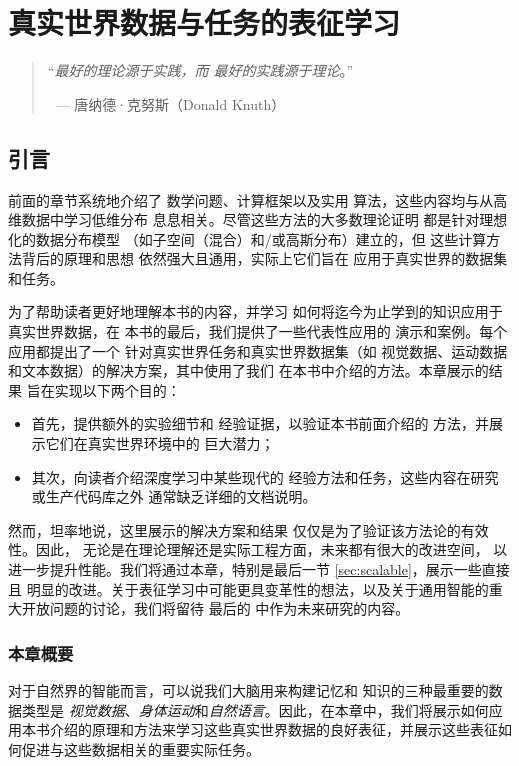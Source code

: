\documentclass[../../book-main_zh.tex]{subfiles}
\begin{document}
\chapter{真实世界数据与任务的表征学习}
\label{ch:applications}

\begin{quote}
    \hfill    ``{\em 最好的理论源于实践，而
    最好的实践源于理论}。''

    $~$ \hfill --- 唐纳德·克努斯（Donald Knuth）
\end{quote}
\vspace{5mm}

\section{引言}
前面的章节系统地介绍了
数学问题、计算框架以及实用
算法，这些内容均与从高维数据中学习低维分布
息息相关。尽管这些方法的大多数理论证明
都是针对理想化的数据分布模型
（如子空间（混合）和/或高斯分布）建立的，但
这些计算方法背后的原理和思想
依然强大且通用，实际上它们旨在
应用于真实世界的数据集和任务。

为了帮助读者更好地理解本书的内容，并学习
如何将迄今为止学到的知识应用于真实世界数据，在
本书的最后，我们提供了一些代表性应用的
演示和案例。每个应用都提出了一个
针对真实世界任务和真实世界数据集（如
视觉数据、运动数据和文本数据）的解决方案，其中使用了我们
在本书中介绍的方法。本章展示的结果
旨在实现以下两个目的：
\begin{itemize}
    \item 首先，提供额外的实验细节和
        经验证据，以验证本书前面介绍的
        方法，并展示它们在真实世界环境中的
        巨大潜力；
    \item 其次，向读者介绍深度学习中某些现代的
        经验方法和任务，这些内容在研究或生产代码库之外
        通常缺乏详细的文档说明。
\end{itemize}
然而，坦率地说，这里展示的解决方案和结果
仅仅是为了验证该方法论的有效性。因此，
无论是在理论理解还是实际工程方面，未来都有很大的改进空间，
以进一步提升性能。我们将通过本章，特别是最后一节 \ref{sec:scalable}，展示一些直接且
明显的改进。关于表征学习中可能更具变革性的想法，以及关于通用智能的重大开放问题的讨论，我们将留待
最后的  中作为未来研究的内容。

\subsection{本章概要}
\label{sec:application_outline}
对于自然界的智能而言，可以说我们大脑用来构建记忆和
知识的三种最重要的数据类型是
{\em 视觉数据}、{\em 身体运动}和{\em 自然语言}。因此，在本章中，我们将展示如何应用本书介绍的原理和方法来学习这些真实世界数据的良好表征，并展示这些表征如何促进与这些数据相关的重要实际任务。
\end{document}
